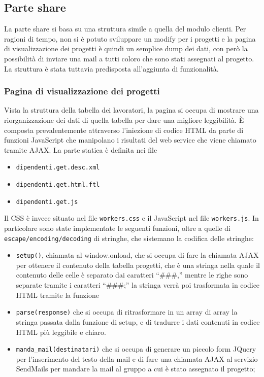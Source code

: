 \subsection{Parte share}
La parte share si basa su una struttura simile a quella del modulo clienti. Per ragioni di tempo, non si è potuto sviluppare un modify per i progetti e la pagina di visualizzazione dei progetti è quindi un semplice dump dei dati, con però la possibilità di inviare una mail a tutti coloro che sono stati assegnati al progetto. La struttura è stata tuttavia predisposta all’aggiunta di funzionalità.

\subsubsection{Pagina di visualizzazione dei progetti}
Vista la struttura della tabella dei lavoratori, la pagina si occupa di mostrare una riorganizzazione dei dati di quella tabella per dare una migliore leggibilità.
È composta prevalentemente attraverso l’iniezione di codice HTML da parte di funzioni JavaScript che manipolano i risultati del web service che viene chiamato tramite AJAX.
La parte statica è definita nei file
\begin {itemize}
\item \texttt{dipendenti.get.desc.xml}
\item \texttt{dipendenti.get.html.ftl}
\item \texttt{dipendenti.get.js}
\end{itemize}
Il CSS è invece situato nel file \texttt{workers.css}  e il JavaScript nel file \texttt{workers.js}. In particolare sono state implementate le seguenti funzioni, oltre a quelle di \texttt{escape/encoding/decoding} di stringhe, che sistemano la codifica delle stringhe:
\begin{itemize}
\item \texttt{setup()}, chiamata al window.onload, che si occupa di fare la chiamata AJAX per ottenere il contenuto della tabella progetti, che è una stringa nella quale il contenuto delle celle è separato dai caratteri  “\#\#\#,” mentre le righe sono separate tramite i caratteri “\#\#\#;” la stringa verrà poi trasformata in codice HTML tramite la funzione
\item \texttt{parse(response)} che si occupa di ritrasformare in un array di array la stringa passata dalla funzione di setup, e di tradurre i dati contenuti in codice HTML  più leggibile e chiaro.
\item \texttt{manda\_mail(destinatari)} che si occupa di generare un piccolo form JQuery per l'inserimento del testo della mail e di fare una chiamata AJAX al servizio SendMails per mandare la mail al gruppo a cui è stato assegnato il progetto;
\end{itemize}

